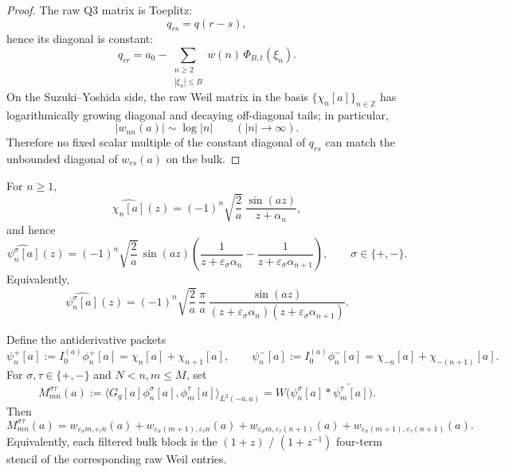 \begin{proof}
The raw Q3 matrix is Toeplitz:
\[
  q_{rs}=q(r-s),
\]
hence its diagonal is constant:
\[
  q_{rr}=a_0-\sum_{\substack{n\ge2\\ |\xi_n|\le B}}
  w(n)\,\Phi_{B,t}(\xi_n).
\]
On the Suzuki--Yoshida side, the raw Weil matrix in the basis
$\{\chi_n[a]\}_{n\in\mathbb Z}$ has logarithmically growing diagonal and
decaying off-diagonal tails; in particular,
\[
  |w_{nn}(a)|\sim \log|n|
  \qquad(|n|\to\infty).
\]
Therefore no fixed scalar multiple of the constant diagonal of $q_{rs}$ can
match the unbounded diagonal of $w_{rs}(a)$ on the bulk.
\end{proof}

\begin{lemma}\label{lem:H1-adjacent-fourier}
For $n\ge 1$,
\[
  \widehat{\chi_n[a]}(z)
  =
  (-1)^n\sqrt{\frac2a}\,\frac{\sin(az)}{z+\alpha_n},
\]
and hence
\[
  \widehat{\psi_n^\sigma[a]}(z)
  =
  (-1)^n\sqrt{\frac2a}\,\sin(az)
  \left(
    \frac{1}{z+\varepsilon_\sigma\alpha_n}
    -
    \frac{1}{z+\varepsilon_\sigma\alpha_{n+1}}
  \right),
  \qquad
  \sigma\in\{+,-\}.
\]
Equivalently,
\[
  \widehat{\psi_n^\sigma[a]}(z)
  =
  (-1)^n\sqrt{\frac2a}\,\frac{\pi}{a}\,
  \frac{\sin(az)}
  {(z+\varepsilon_\sigma\alpha_n)(z+\varepsilon_\sigma\alpha_{n+1})}.
\]
\end{lemma}

\begin{proposition}\label{prop:H1-raw-entry-reduction}
Define the antiderivative packets
\[
  \psi_n^+[a]:=I_0^{(a)}\phi_n^+[a]=\chi_n[a]+\chi_{n+1}[a],
  \qquad
  \psi_n^-[a]:=I_0^{(a)}\phi_n^-[a]=\chi_{-n}[a]+\chi_{-(n+1)}[a].
\]
For $\sigma,\tau\in\{+,-\}$ and $N<n,m\le M$, set
\[
  M_{mn}^{\sigma\tau}(a)
  :=
  \bigl\langle G_g[a]\phi_n^\sigma[a],\phi_m^\tau[a]\bigr\rangle_{L^2(-a,a)}
  =
  W\bigl(\psi_n^\sigma[a]*\widetilde{\psi_m^\tau[a]}\bigr).
\]
Then
\[
  M_{mn}^{\sigma\tau}(a)
  =
  w_{\varepsilon_\sigma m,\varepsilon_\tau n}(a)
  +
  w_{\varepsilon_\sigma(m+1),\varepsilon_\tau n}(a)
  +
  w_{\varepsilon_\sigma m,\varepsilon_\tau(n+1)}(a)
  +
  w_{\varepsilon_\sigma(m+1),\varepsilon_\tau(n+1)}(a).
\]
Equivalently, each filtered bulk block is the $(1+z)$ / $(1+z^{-1})$
four-term stencil of the corresponding raw Weil entries.
\end{proposition}


